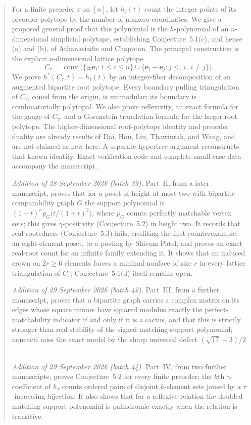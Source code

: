 \documentclass[11pt]{article}
\numberwithin{equation}{section}
\theoremstyle{definition}
\newcommand{\conv}{\operatorname{conv}}
\newcommand{\ee}{\mathbf e}
\begin{document}
\begin{abstract}
For a finite preorder $\tau$ on $[n]$, let $h_\tau(t)$ count the integer points of
its preorder polytope by the number of nonzero coordinates. We give a proposed
general proof that this polynomial is the $h$-polynomial of an $n$-dimensional
simplicial polytope, establishing Conjecture~5.1(c), and hence (a) and (b), of
Athanasiadis and Chapoton. The principal construction is the explicit
$n$-dimensional lattice polytope
\[
 C_\tau=\conv\bigl(\{\pm\ee_i:1\leq i\leq n\}
 \cup\{\ee_i-\ee_j:j\leq_\tau i,\ i\ne j\}\bigr).
\]
We prove $h^*(C_\tau,t)=h_\tau(t)$ by an integer-fiber decomposition of an
augmented bipartite root polytope. Every boundary pulling triangulation of
$C_\tau$, coned from the origin, is unimodular; its boundary is combinatorially
polytopal. We also prove reflexivity, an exact formula for the gauge of $C_\tau$,
and a Gorenstein translation formula for the larger root polytope. The
higher-dimensional root-polytope identity and preorder duality are already
results of Dai, Hou, Liu, Thawinrak, and Wang, and are not claimed as new here.
A separate hypertree argument reconstructs that known identity. Exact
verification code and complete small-case data accompany the manuscript.

\emph{Addition of 28 September 2026 (batch 39).} Part~II, from a later
manuscript, proves that for a poset of height at most two with bipartite
comparability graph $G$ the support polynomial is
$(1+t)^np_G\bigl(t/(1+t)^2\bigr)$, where $p_G$ counts perfectly matchable
vertex sets; this gives $\gamma$-positivity (Conjecture~5.2) in height two.
It records that real-rootedness (Conjecture~5.3) fails, crediting the first
counterexample, an eight-element poset, to a posting by Shivam Patel, and
proves an exact real-root count for an infinite family extending it. It shows
that an induced crown on $2r\geq6$ elements forces a minimal nonface of size
$r$ in every lattice triangulation of $C_\tau$; Conjecture~5.1(d) itself
remains open.

\emph{Addition of 29 September 2026 (batch 42).} Part~III, from a further
manuscript, proves that a bipartite graph carries a complex matrix on its
edges whose square minors have squared modulus exactly the
perfect-matchability indicator if and only if it is a cactus, and that this
is strictly stronger than real stability of the signed matching-support
polynomial; noncacti miss the exact model by the sharp universal defect
$(\sqrt{17}-3)/2$.

\emph{Addition of 29 September 2026 (batch 44).} Part~IV, from two further
manuscripts, proves Conjecture~5.2 for every finite preorder: the $k$th
$\gamma$-coefficient of $h_\tau$ counts ordered pairs of disjoint
$k$-element sets joined by a $\tau$-increasing bijection. It also shows that
for a reflexive relation the doubled matching-support polynomial is
palindromic exactly when the relation is transitive.


\end{abstract}
\end{document}

